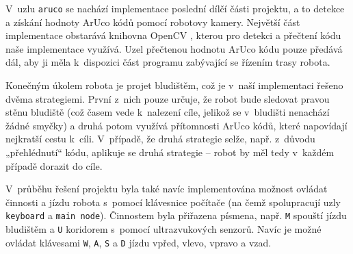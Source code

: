 V~uzlu \texttt{aruco} se nachází implementace poslední dílčí části projektu, a to detekce a získání hodnoty ArUco kódů pomocí robotovy kamery. Největší část implementace obstarává knihovna OpenCV \cite{opencv}, kterou pro detekci a přečtení kódu naše implementace využívá. Uzel přečtenou hodnotu ArUco kódu pouze předává dál, aby ji měla k~dispozici část programu zabývající se řízením trasy robota.

Konečným úkolem robota je projet bludištěm, což je v~naší implementaci řešeno dvěma strategiemi. První z~nich pouze určuje, že robot bude sledovat pravou stěnu bludiště (což časem vede k~nalezení cíle, jelikož se v~bludišti nenachází žádné smyčky) a druhá potom využívá přítomnosti ArUco kódů, které napovídají nejkratší cestu k~cíli. V~případě, že druhá strategie selže, např. z~důvodu „přehlédnutí“ kódu, aplikuje se druhá strategie – robot by měl tedy v~každém případě dorazit do cíle.

V~průběhu řešení projektu byla také navíc implementována možnost ovládat činnosti a jízdu robota s~pomocí klávesnice počítače (na čemž spolupracují uzly \texttt{keyboard} a \texttt{main node}). Činnostem byla přiřazena písmena, např. \texttt{M} spouští jízdu bludištěm a \texttt{U} koridorem s~pomocí ultrazvukových senzorů. Navíc je možné ovládat klávesami \texttt{W}, \texttt{A}, \texttt{S} a \texttt{D} jízdu vpřed, vlevo, vpravo a vzad.
